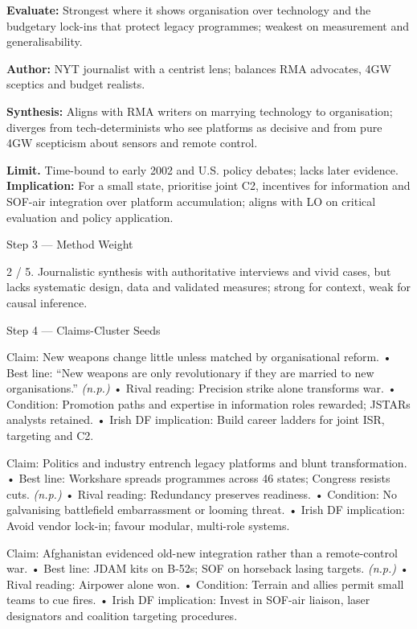 \textbf{Evaluate:} Strongest where it shows organisation over technology and the budgetary lock-ins that protect legacy programmes; weakest on measurement and generalisability.

\textbf{Author:} NYT journalist with a centrist lens; balances RMA advocates, 4GW sceptics and budget realists.

\textbf{Synthesis:} Aligns with RMA writers on marrying technology to organisation; diverges from tech-determinists who see platforms as decisive and from pure 4GW scepticism about sensors and remote control.

\textbf{Limit.} Time-bound to early 2002 and U.S. policy debates; lacks later evidence. \textbf{Implication:} For a small state, prioritise joint C2, incentives for information and SOF-air integration over platform accumulation; aligns with LO on critical evaluation and policy application.

Step 3 — Method Weight

2 / 5. Journalistic synthesis with authoritative interviews and vivid cases, but lacks systematic design, data and validated measures; strong for context, weak for causal inference.

Step 4 — Claims-Cluster Seeds

Claim: New weapons change little unless matched by organisational reform.
• Best line: “New weapons are only revolutionary if they are married to new organisations.” \emph{(n.p.)}
• Rival reading: Precision strike alone transforms war.
• Condition: Promotion paths and expertise in information roles rewarded; JSTARs analysts retained.
• Irish DF implication: Build career ladders for joint ISR, targeting and C2.

Claim: Politics and industry entrench legacy platforms and blunt transformation.
• Best line: Workshare spreads programmes across 46 states; Congress resists cuts. \emph{(n.p.)}
• Rival reading: Redundancy preserves readiness.
• Condition: No galvanising battlefield embarrassment or looming threat.
• Irish DF implication: Avoid vendor lock-in; favour modular, multi-role systems.

Claim: Afghanistan evidenced old-new integration rather than a remote-control war.
• Best line: JDAM kits on B-52s; SOF on horseback lasing targets. \emph{(n.p.)}
• Rival reading: Airpower alone won.
• Condition: Terrain and allies permit small teams to cue fires.
• Irish DF implication: Invest in SOF-air liaison, laser designators and coalition targeting procedures.

